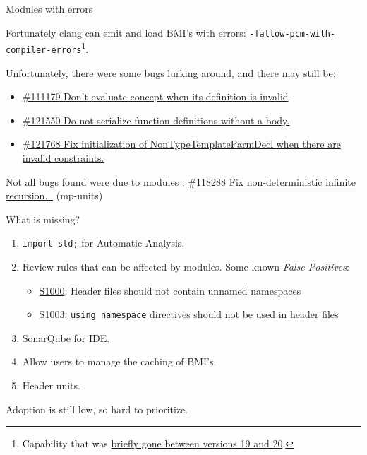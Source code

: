 \documentclass[]{beamer}
\begin{document}
\begin{frame}[t]{Modules with errors}
  \begin{block}{}
    \small Fortunately clang can emit and load BMI's with errors: \texttt{-fallow-pcm-with-compiler-errors}\footnote{Capability that was \href{https://github.com/llvm/llvm-project/pull/121485}{briefly gone between versions 19 and 20}.}.

    \vspace{0.5em}

    Unfortunately, there were some bugs lurking around, and there may still be:
    \begin{itemize}
      \item \href{https://github.com/llvm/llvm-project/pull/111179}{\#111179 Don't evaluate concept when its definition is invalid}
      \item \href{https://github.com/llvm/llvm-project/pull/121550}{\#121550 Do not serialize function definitions without a body.}
      \item \href{https://github.com/llvm/llvm-project/pull/121768}{\#121768 Fix initialization of NonTypeTemplateParmDecl when there are invalid constraints.}
    \end{itemize}
  \end{block}
  \begin{block}{}
    \small Not all bugs found were due to modules :
    \href{https://github.com/llvm/llvm-project/pull/118288}{\#118288 Fix non-deterministic infinite recursion...} (mp-units)
  \end{block}
\end{frame}

\begin{frame}{What is missing?}
  \begin{block}{}
    \begin{enumerate}
      \item \texttt{import std;} for Automatic Analysis.
      \item Review rules that can be affected by modules. Some known \emph{False Positives}:
            \begin{itemize}
              \item \href{https://sonarsource.github.io/rspec/\#/rspec/S1000/cfamily}{S1000}: Header files should not contain unnamed namespaces
              \item \href{https://sonarsource.github.io/rspec/\#/rspec/S1003/cfamily}{S1003}: \texttt{using namespace} directives should not be used in header files
            \end{itemize}
      \item SonarQube for IDE.
      \item Allow users to manage the caching of BMI's.
      \item Header units.
    \end{enumerate}
    Adoption is still low, so hard to prioritize.
  \end{block}
\end{frame}
\end{document}
